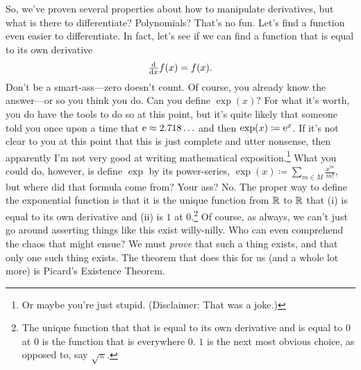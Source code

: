So, we've proven several properties about how to manipulate derivatives, but what is there to differentiate?  Polynomials?  That's no fun.  Let's find a function even easier to differentiate.  In fact, let's see if we can find a function that is equal to its own derivative
\begin{equation}
\tfrac{\mathop{}\!\mathrm{d}}{\mathop{}\!\mathrm{d} x}f(x)=f(x).
\end{equation}
Don't be a smart-ass---zero doesn't count.  Of course, you already know the answer---or so you think you do.  Can you define $\exp (x)$?  For what it's worth, you do have the tools to do so at this point, but it's quite likely that someone told you once upon a time that $\mathrm{e} \approx 2.718\ldots $ and then $\exp (x)\coloneqq \mathrm{e} ^x$.  If it's not clear to you at this point that this is just complete and utter nonsense, then apparently I'm not very good at writing mathematical exposition.\footnote{Or maybe you're just stupid.  (Disclaimer:  That was a joke.)}  What you could do, however, is define $\exp$ by its power-series, $\exp (x)\coloneqq \sum _{m\in M}\frac{x^m}{m!}$, but where did that formula come from?  Your ass?  No.  The proper way to define the exponential function is that it is the unique function from $\mathbb{R}$ to $\mathbb{R}$ that (i) is equal to its own derivative and (ii) is $1$ at $0$.\footnote{The unique function that that is equal to its own derivative and is equal to $0$ at $0$ is the function that is everywhere $0$.  $1$ is the next most obvious choice, as opposed to, say $\sqrt{\uppi}$.}  Of course, as always, we can't just go around asserting things like this exist willy-nilly.  Who can even comprehend the chaos that might ensue?  We must \emph{prove} that such a thing exists, and that only one such thing exists.  The theorem that does this for us (and a whole lot more) is Picard's Existence Theorem.
